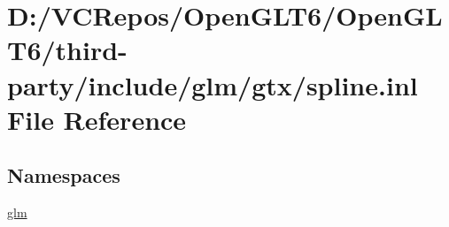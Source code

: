 \hypertarget{spline_8inl}{}\section{D\+:/\+V\+C\+Repos/\+Open\+G\+L\+T6/\+Open\+G\+L\+T6/third-\/party/include/glm/gtx/spline.inl File Reference}
\label{spline_8inl}
\subsection*{Namespaces}
\begin{DoxyCompactItemize}
\item 
 \mbox{\hyperlink{namespaceglm}{glm}}
\end{DoxyCompactItemize}
